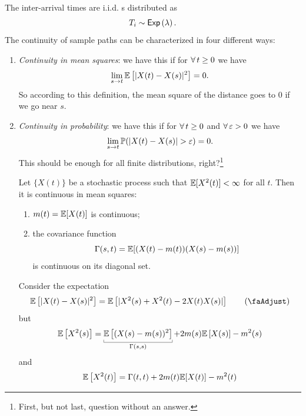 \documentclass[12pt]{report}
\begin{document}
	The inter-arrival times are i.i.d. \rv s distributed as
	\begin{equation*}
		T_i\sim\mathsf{Exp}\left(\lambda\right).
	\end{equation*}
	The continuity of sample paths can be characterized in four different ways:
	\begin{enumerate}
		\item \emph{Continuity in mean squares}: we have this if for $\forall\, t\geq0$ we have
		\begin{equation*}
			\lim_{s\to t}\mathbb{E}\left[|X(t)-X(s)|^{2}\right]=0.
		\end{equation*}
		So according to this definition, the mean square of the distance goes to 0 if we go near $s$.
		\item \emph{Continuity in probability}: we have this if for $\forall\, t\geq0$ and $\forall\,\varepsilon>0$ we have
		\begin{equation*}
			\lim_{s\to t}\pr(|X(t)-X(s)|>\varepsilon)=0.
		\end{equation*}
		This should be enough for all finite distributions, right?\footnote{First, but not last, question without an answer.}
		\begin{theorem}
			Let $\{X(t)\}$ be a stochastic process such that $\mathbb{E}[X^{2}(t)]<\infty$ for all $t$. Then it is continuous in mean squares\ifonly{}:
			\begin{enumerate}
				\item $m(t)=\mathbb{E}[X(t)]$ is continuous;
				\item the covariance function
				\begin{equation*}
					\Gamma(s,t)=\mathbb{E}[(X(t)-m(t))(X(s)-m(s))]
				\end{equation*}
				is continuous on its diagonal set.
			\end{enumerate}
		\end{theorem}
					\begin{fancyproof}
			Consider the expectation
			\begin{equation*}
				\evs\left[|X(t)-X(s)|^{2}\right]=\evs\left[|X^{2}(s)+X^{2}(t)-2X(t)X(s)|\right]\tag{\faAdjust}\label{boh}
			\end{equation*}
			but
			\begin{equation*}
				\evs\left[X^{2}(s)\right]=\ubracketthin{\evs\left[(X(s)-m(s))^{2}\right]}_{\Gamma(s,s)}+2m(s)\evs\left[X(s)\right]-m^{2}(s)
			\end{equation*}
			and
			\begin{equation*}
				\evs\left[X^{2}(t)\right]=\Gamma(t,t)+2m(t)\evs[X(t)]-m^{2}(t)

\end{equation*}
\end{fancyproof}
\end{enumerate}
\end{document}
